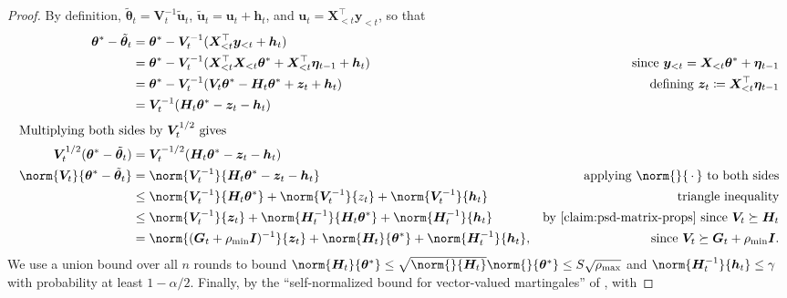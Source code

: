 \documentclass{article}
\renewcommand{\vec}[1]{\bm{#1}}
\newcommand{\wildcard}{\mathinner{\,{\cdot}\,}}
\newcommand{\defeq}{\coloneq}
\newcommand{\inv}[1]{#1^{-1}}
\providecommand\transp{\top}
\let\transpsymbol\transp
\renewcommand{\transp}[1]{#1^\transpsymbol}
\newcommand{\Eye}[1][]{\bm{I}\notblank{#1}{_{{#1}\times{#1}}}{}}
\newcommand{\XtX}[1]{\transp{#1}{#1}}
\begin{document}
\CalcBeta*

\begin{proof}
  By definition, $\tilde{\vec\theta}_t = \inv{\vec V_t} \tilde{\vec u}_t$,
  $\tilde{\vec u}_t = \vec u_t + \vec h_t$, and $\vec u_t = \transp{\vec
    X_{<t}} \vec y_{<t}$, so that
  \begin{align*}
    \vec\theta^* - \tilde{\vec\theta}_t
    &= \vec\theta^* - \inv{\vec V_t}(\transp{\vec X_{<t}} \vec y_{<t} + \vec h_t) \\
    &= \vec\theta^* - \inv{\vec V_t}(\XtX{\vec X_{<t}} \vec\theta^*
      + \transp{\vec X_{<t}} \vec\eta_{t-1} + \vec h_t)
    &\text{since } \vec y_{<t} = \vec X_{<t} \vec\theta^* + \vec\eta_{t-1} \\
    &= \vec\theta^* - \inv{\vec V_t}(\vec V_t \vec\theta^* - \vec H_t \vec\theta^* + \vec z_t + \vec h_t)
    &\text{defining } \vec z_t \defeq \transp{\vec X_{<t}} \vec\eta_{t-1} \\
    &= \inv{\vec V_t}(\vec H_t\vec\theta^* - \vec z_t - \vec h_t) \\
    \shortintertext{Multiplying both sides by $\vec V_t^{1/2}$ gives}
    \vec V_t^{1/2}(\vec\theta^* - \tilde{\vec\theta}_t)
    &= \vec V_t^{-1/2}(\vec H_t\vec\theta^* - \vec z_t - \vec h_t) \\
    \norm{\vec V_t}{\vec\theta^* - \tilde{\vec\theta}_t}
    &= \norm{\inv{\vec V_t}}{\vec H_t\vec\theta^* - \vec z_t - \vec h_t}
    &\text{applying $\norm{}{\wildcard}$ to both sides}\\
    &\le \norm{\inv{\vec V_t}}{\vec H_t\vec\theta^*} + \norm{\inv{\vec V_t}}{z_t}
      + \norm{\inv{\vec V_t}}{\vec h_t} &\text{triangle inequality} \\
    &\le \norm{\inv{\vec V_t}}{\vec z_t} + \norm{\inv{\vec H_t}}{\vec H_t\vec\theta^*}
      + \norm{\inv{\vec H_t}}{\vec h_t}
    &\text{by \cref{claim:psd-matrix-props} since } \vec V_t \succeq \vec H_t \\
    &= \norm{\inv{(\vec G_t+\rho_{\min}\Eye)}}{\vec z_t} + \norm{\vec H_t}{\vec\theta^*} +
      \norm{\inv{\vec H_t}}{\vec h_t},
    &\text{since } \vec V_t \succeq \vec G_t + \rho_{\min}\Eye.
  \end{align*}
  We use a union bound over all $n$ rounds to bound
  $\norm{\vec H_t}{\vec\theta^*} \le
  \sqrt{\norm{}{\vec H_t}}\norm{}{\vec\theta^*} \le S\sqrt{\rho_{\max}}$
  and $\norm{\inv{\vec H_t}}{\vec h_t} \le \gamma$ with probability at
  least $1-\alpha/2$.  Finally, by the ``self-normalized bound for
  vector-valued martingales'' of
  \citet[Theorem~1]{AbbasiYadkoriImprovedAlgorithmsLinear2011}, with

\end{proof}
\end{document}

